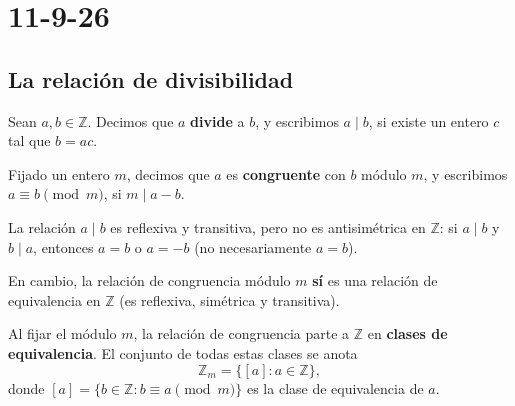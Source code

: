 \chapter{11-9-26}
\section{La relación de divisibilidad}

\begin{definicion}
Sean $a,b \in \mathbb{Z}$. Decimos que $a$ \textbf{divide} a $b$, y
escribimos $a \mid b$, si existe un entero $c$ tal que $b=ac$.
\end{definicion}

\begin{definicion}
Fijado un entero $m$, decimos que $a$ es \textbf{congruente} con $b$
módulo $m$, y escribimos $a \equiv b \pmod m$, si $m \mid a-b$.
\end{definicion}

\begin{nota}
La relación $a \mid b$ es reflexiva y transitiva, pero no es
antisimétrica en $\mathbb{Z}$: si $a\mid b$ y $b \mid a$, entonces
$a=b$ o $a=-b$ (no necesariamente $a=b$).

En cambio, la relación de congruencia módulo $m$ \textbf{sí} es una
relación de equivalencia en $\mathbb{Z}$ (es reflexiva, simétrica y
transitiva).
\end{nota}

\begin{teoria}
Al fijar el módulo $m$, la relación de congruencia parte a
$\mathbb{Z}$ en \textbf{clases de equivalencia}. El conjunto de todas
estas clases se anota
\[
\mathbb{Z}_m = \{ [a] : a \in \mathbb{Z} \},
\]
donde $[a] = \{ b \in \mathbb{Z} : b \equiv a \pmod m \}$ es la clase
de equivalencia de $a$.
\end{teoria}

